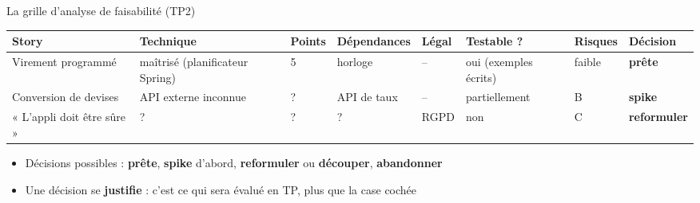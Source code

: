 \documentclass[aspectratio=169,10pt]{beamer}
\begin{document}
\begin{frame}{La grille d'analyse de faisabilité (TP2)}
  \scriptsize
  \begin{datacard}
    \setlength{\tabcolsep}{3pt}
    \begin{tabular}{@{}p{2.0cm}p{2.0cm}p{0.8cm}p{1.5cm}p{0.9cm}p{1.7cm}p{1.1cm}p{1.6cm}@{}}
      \toprule
      \textbf{Story} & \textbf{Technique} & \textbf{Points} & \textbf{Dépendances} & \textbf{Légal} & \textbf{Testable ?} & \textbf{Risques} & \textbf{Décision} \\
      \midrule
      Virement programmé & maîtrisé (planificateur Spring) & 5 & horloge & -- & oui (exemples écrits) & faible & \textbf{\color{qaaccent}prête} \\[1mm]
      Conversion de devises & API externe inconnue & ? & API de taux & -- & partiellement & B & \textbf{\color{qaaccent2}spike} \\[1mm]
      « L'appli doit être sûre » & ? & ? & ? & RGPD & non & C & \textbf{\color{qaaccent2}reformuler} \\
      \bottomrule
    \end{tabular}
  \end{datacard}
  \vspace{2mm}
  \normalsize
  \begin{itemize}
    \item Décisions possibles : \textbf{prête}, \textbf{spike} d'abord, \textbf{reformuler} ou \textbf{découper}, \textbf{abandonner}
    \item Une décision se \textbf{justifie} : c'est ce qui sera évalué en TP, plus que la case cochée
  \end{itemize}
\end{frame}
\end{document}
